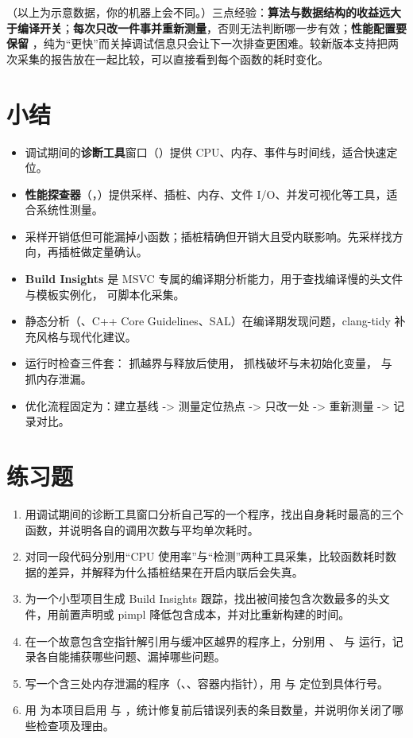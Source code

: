 （以上为示意数据，你的机器上会不同。）三点经验：\textbf{算法与数据结构的收益远大于编译开关}；\textbf{每次只改一件事并重新测量}，否则无法判断哪一步有效；\textbf{性能配置要保留 }，纯为“更快”而关掉调试信息只会让下一次排查更困难。较新版本支持把两次采集的报告放在一起比较，可以直接看到每个函数的耗时变化。

\section{小结}
\begin{itemize}
  \item 调试期间的\textbf{诊断工具}窗口（）提供 CPU、内存、事件与时间线，适合快速定位。
  \item \textbf{性能探查器}（，）提供采样、插桩、内存、文件 I/O、并发可视化等工具，适合系统性测量。
  \item 采样开销低但可能漏掉小函数；插桩精确但开销大且受内联影响。先采样找方向，再插桩做定量确认。
  \item \textbf{Build Insights} 是 MSVC 专属的编译期分析能力，用于查找编译慢的头文件与模板实例化， 可脚本化采集。
  \item 静态分析（、C++ Core Guidelines、SAL）在编译期发现问题，clang-tidy 补充风格与现代化建议。
  \item 运行时检查三件套： 抓越界与释放后使用， 抓栈破坏与未初始化变量， 与  抓内存泄漏。
  \item 优化流程固定为：建立基线 -> 测量定位热点 -> 只改一处 -> 重新测量 -> 记录对比。
\end{itemize}

\section{练习题}
\begin{enumerate}
  \item 用调试期间的诊断工具窗口分析自己写的一个程序，找出自身耗时最高的三个函数，并说明各自的调用次数与平均单次耗时。
  \item 对同一段代码分别用“CPU 使用率”与“检测”两种工具采集，比较函数耗时数据的差异，并解释为什么插桩结果在开启内联后会失真。
  \item 为一个小型项目生成 Build Insights 跟踪，找出被间接包含次数最多的头文件，用前置声明或 pimpl 降低包含成本，并对比重新构建的时间。
  \item 在一个故意包含空指针解引用与缓冲区越界的程序上，分别用 、 与  运行，记录各自能捕获哪些问题、漏掉哪些问题。
  \item 写一个含三处内存泄漏的程序（、、容器内指针），用  与  定位到具体行号。
  \item 用  为本项目启用  与 ，统计修复前后错误列表的条目数量，并说明你关闭了哪些检查项及理由。
\end{enumerate}

